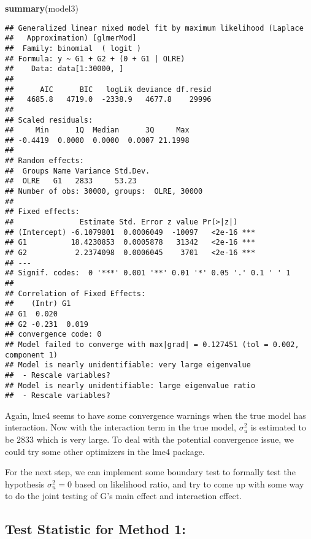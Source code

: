 \documentclass[]{article}
\newenvironment{Shaded}{\begin{snugshade}}{\end{snugshade}}
\newcommand{\KeywordTok}[1]{\textcolor[rgb]{0.13,0.29,0.53}{\textbf{#1}}}
\newcommand{\NormalTok}[1]{#1}
\begin{document}
\begin{Shaded}
\begin{Highlighting}[]
\KeywordTok{summary}\NormalTok{(model3)}
\end{Highlighting}
\end{Shaded}

\begin{verbatim}
## Generalized linear mixed model fit by maximum likelihood (Laplace
##   Approximation) [glmerMod]
##  Family: binomial  ( logit )
## Formula: y ~ G1 + G2 + (0 + G1 | OLRE)
##    Data: data[1:30000, ]
## 
##      AIC      BIC   logLik deviance df.resid 
##   4685.8   4719.0  -2338.9   4677.8    29996 
## 
## Scaled residuals: 
##     Min      1Q  Median      3Q     Max 
## -0.4419  0.0000  0.0000  0.0007 21.1998 
## 
## Random effects:
##  Groups Name Variance Std.Dev.
##  OLRE   G1   2833     53.23   
## Number of obs: 30000, groups:  OLRE, 30000
## 
## Fixed effects:
##               Estimate Std. Error z value Pr(>|z|)    
## (Intercept) -6.1079801  0.0006049  -10097   <2e-16 ***
## G1          18.4230853  0.0005878   31342   <2e-16 ***
## G2           2.2374098  0.0006045    3701   <2e-16 ***
## ---
## Signif. codes:  0 '***' 0.001 '**' 0.01 '*' 0.05 '.' 0.1 ' ' 1
## 
## Correlation of Fixed Effects:
##    (Intr) G1    
## G1  0.020       
## G2 -0.231  0.019
## convergence code: 0
## Model failed to converge with max|grad| = 0.127451 (tol = 0.002, component 1)
## Model is nearly unidentifiable: very large eigenvalue
##  - Rescale variables?
## Model is nearly unidentifiable: large eigenvalue ratio
##  - Rescale variables?
\end{verbatim}

Again, lme4 seems to have some convergence warnings when the true model
has interaction. Now with the interaction term in the true model,
\(\sigma_u^2\) is estimated to be \(2833\) which is very large. To deal
with the potential convergence issue, we could try some other optimizers
in the lme4 package.

For the next step, we can implement some boundary test to formally test
the hypothesis \(\sigma_u^2 = 0\) based on likelihood ratio, and try to
come up with some way to do the joint testing of G's main effect and
interaction effect.

\hypertarget{test-statistic-for-method-1}{%
\subsection{Test Statistic for Method
1:}\label{test-statistic-for-method-1}}
\end{document}
